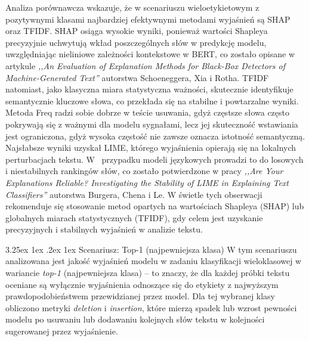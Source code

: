 \documentclass[wmii, inf, mgr]{uwmthesis}
\makeatletter
\renewcommand\paragraph{\@startsection{paragraph}{4}{\z@}%
  {3.25ex \@plus1ex \@minus.2ex}%
  {1ex}%
  {\normalfont\normalsize\bfseries}}
\makeatother
\begin{document}
Analiza porównawcza wskazuje, że w scenariuszu wieloetykietowym z pozytywnymi klasami najbardziej efektywnymi metodami wyjaśnień są SHAP oraz TFIDF. SHAP osiąga wysokie wyniki, ponieważ wartości Shapleya precyzyjnie uchwytują wkład poszczególnych słów w predykcję modelu, uwzględniając nieliniowe zależności kontekstowe w BERT, co zostało opisane w artykule \textit{,,An Evaluation of Explanation Methods for Black-Box Detectors of Machine-Generated Text''} \cite{SHAP4} autorstwa Schoeneggera, Xia i Rotha. TFIDF natomiast, jako klasyczna miara statystyczna ważności, skutecznie identyfikuje semantycznie kluczowe słowa, co przekłada się na stabilne i powtarzalne wyniki. Metoda Freq radzi sobie dobrze w teście usuwania, gdyż częstsze słowa często pokrywają się z ważnymi dla modelu sygnałami, lecz jej skuteczność wstawiania jest ograniczona, gdyż wysoka częstość nie zawsze oznacza istotność semantyczną. Najsłabsze wyniki uzyskał LIME, którego wyjaśnienia opierają się na lokalnych perturbacjach tekstu. W~ przypadku modeli językowych prowadzi to do losowych i niestabilnych rankingów słów, co zostało potwierdzone w pracy \textit{,,Are Your Explanations Reliable? Investigating the Stability of LIME in Explaining Text Classifiers''} \cite{LIME3} autorstwa Burgera, Chena i Le. W świetle tych obserwacji rekomenduje się stosowanie metod opartych na wartościach Shapleya (SHAP) lub globalnych miarach statystycznych (TFIDF), gdy celem jest uzyskanie precyzyjnych i stabilnych wyjaśnień w analizie tekstu.


\paragraph{Scenariusz: Top-1 (najpewniejsza klasa)}
W tym scenariuszu analizowana jest jakość wyjaśnień modelu w zadaniu klasyfikacji wieloklasowej w wariancie \textit{top-1} (najpewniejsza klasa) -- to znaczy, że dla każdej próbki tekstu oceniane są wyłącznie wyjaśnienia odnoszące się do etykiety z najwyższym prawdopodobieństwem przewidzianej przez model. Dla tej wybranej klasy obliczono metryki \textit{deletion} i \textit{insertion}, które mierzą spadek lub wzrost pewności modelu po usuwaniu lub dodawaniu kolejnych słów tekstu w kolejności sugerowanej przez wyjaśnienie.
\end{document}
